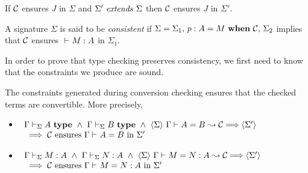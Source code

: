 \begin{remark} \label{lemExtendEnsures}
    If $\mathcal{C}$ ensures $J$ in $\Sigma$ and ${\Sigma'} ~ \mathit{extends} ~ {\Sigma}$ then $\mathcal{C}$
    ensures $J$ in $\Sigma'$.
\end{remark}

\begin{definition} \label{defConsistentSig}
    A signature $\Sigma$ is said to be {\em consistent} if $\Sigma = {\Sigma_1},\,{} {{p} : {A} = {M} ~\mathbf{when}~ {\mathcal{C}}},\,{} \Sigma_2$ implies that $\mathcal{C}$ ensures
    ${} \vdash_{} {M} : {A}$ in $\Sigma_1$.
\end{definition}

In order to prove that type checking preserves consistency, we first need to
know that the constraints we produce are sound.

\begin{lemma} \label{lemSoundConstraints}
    The constraints generated during conversion checking ensures that the
    checked terms are convertible.
\if {}
    More precisely,
    \begin{itemize}
	\item \( \begin{array}[t]{l}
		    {\Gamma} \vdash_{\Sigma}A ~ \mathbf{type}
		    ~ \wedge ~ {\Gamma} \vdash_{\Sigma}B ~ \mathbf{type}
		    ~ \wedge ~ \langle {\Sigma} \rangle ~ {{\Gamma} \vdash {A} = {B} \leadsto {\mathcal{C}}} \Longrightarrow \langle {\Sigma'} \rangle
		    \\ {} \implies \mbox{$\mathcal{C}$ ensures ${\Gamma} \vdash_{}A=B$ in $\Sigma'$}
	      \end{array} \)
	\item \( \begin{array}[t]{l}
		    {\Gamma} \vdash_{\Sigma} {M} : {A}
		    ~ \wedge ~ {\Gamma} \vdash_{\Sigma} {N} : {A}
		    ~ \wedge ~ \langle {\Sigma} \rangle ~ {{\Gamma} \vdash {M} = {N} : {A} \leadsto {\mathcal{C}}} \Longrightarrow \langle {\Sigma'} \rangle
		    \\ {} \implies \mbox{$\mathcal{C}$ ensures ${\Gamma} \vdash_{}M=N:A$ in $\Sigma'$}
	      \end{array} \)
    \end{itemize}
\fi
\end{lemma}

